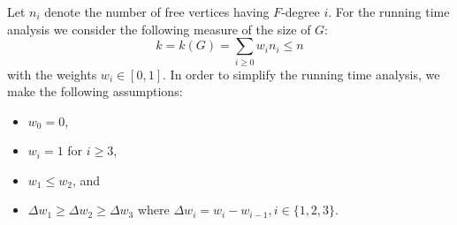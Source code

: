\documentclass[a4paper,10pt]{article}
\theoremstyle{plain}
\theoremstyle{definition}
\theoremstyle{remark}
\begin{document}
Let $n_i$ denote the number of free vertices having $F$-degree $i$.
For the running time analysis we consider the following measure of the size of $G$:
\begin{equation*}
 k=k(G)=\sum_{i \geq 0} w_i n_i \leq n
\end{equation*}
with the weights $w_i \in [0,1]$.
In order to simplify the running time analysis, we make the following assumptions:

\begin{itemize}
\item $w_0=0$,
\item $w_i=1$ for $i \geq 3$,
\item $w_1 \leq w_2$, and
\item $\Delta w_1 \geq \Delta w_2 \geq \Delta w_3$ where $\Delta w_i = w_i-w_{i-1}, i \in \{1,2,3\}$.
\end{itemize}
\end{document}
